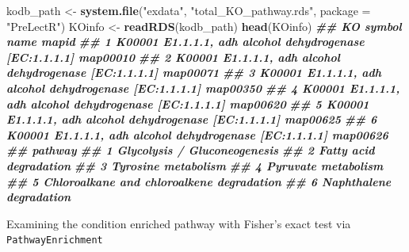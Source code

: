\documentclass[
]{article}
\newenvironment{Shaded}{\begin{snugshade}}{\end{snugshade}}
\newcommand{\AttributeTok}[1]{\textcolor[rgb]{0.13,0.29,0.53}{#1}}
\newcommand{\DocumentationTok}[1]{\textcolor[rgb]{0.56,0.35,0.01}{\textbf{\textit{#1}}}}
\newcommand{\FunctionTok}[1]{\textcolor[rgb]{0.13,0.29,0.53}{\textbf{#1}}}
\newcommand{\NormalTok}[1]{#1}
\newcommand{\OtherTok}[1]{\textcolor[rgb]{0.56,0.35,0.01}{#1}}
\newcommand{\StringTok}[1]{\textcolor[rgb]{0.31,0.60,0.02}{#1}}
\begin{document}
\begin{Shaded}
\begin{Highlighting}[]
\NormalTok{kodb\_path }\OtherTok{\textless{}{-}} \FunctionTok{system.file}\NormalTok{(}\StringTok{"exdata"}\NormalTok{, }\StringTok{"total\_KO\_pathway.rds"}\NormalTok{, }\AttributeTok{package =} \StringTok{"PreLectR"}\NormalTok{)}
\NormalTok{KOinfo }\OtherTok{\textless{}{-}} \FunctionTok{readRDS}\NormalTok{(kodb\_path)}
\FunctionTok{head}\NormalTok{(KOinfo)}
\DocumentationTok{\#\#       KO        symbol                               name    mapid}
\DocumentationTok{\#\# 1 K00001 E1.1.1.1, adh alcohol dehydrogenase [EC:1.1.1.1] map00010}
\DocumentationTok{\#\# 2 K00001 E1.1.1.1, adh alcohol dehydrogenase [EC:1.1.1.1] map00071}
\DocumentationTok{\#\# 3 K00001 E1.1.1.1, adh alcohol dehydrogenase [EC:1.1.1.1] map00350}
\DocumentationTok{\#\# 4 K00001 E1.1.1.1, adh alcohol dehydrogenase [EC:1.1.1.1] map00620}
\DocumentationTok{\#\# 5 K00001 E1.1.1.1, adh alcohol dehydrogenase [EC:1.1.1.1] map00625}
\DocumentationTok{\#\# 6 K00001 E1.1.1.1, adh alcohol dehydrogenase [EC:1.1.1.1] map00626}
\DocumentationTok{\#\#                                     pathway}
\DocumentationTok{\#\# 1              Glycolysis / Gluconeogenesis}
\DocumentationTok{\#\# 2                    Fatty acid degradation}
\DocumentationTok{\#\# 3                       Tyrosine metabolism}
\DocumentationTok{\#\# 4                       Pyruvate metabolism}
\DocumentationTok{\#\# 5 Chloroalkane and chloroalkene degradation}
\DocumentationTok{\#\# 6                   Naphthalene degradation}
\end{Highlighting}
\end{Shaded}

Examining the condition enriched pathway with Fisher's exact test via
\texttt{PathwayEnrichment}
\end{document}

